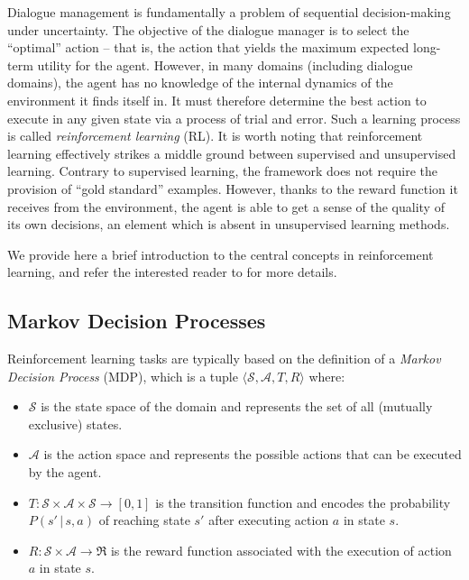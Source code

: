 Dialogue management is fundamentally a problem of sequential decision-making under uncertainty. The objective of the dialogue manager is to select the ``optimal'' action -- that is, the action that yields the maximum expected long-term utility for the agent. However, in many domains (including dialogue domains), the agent has no knowledge of the internal dynamics of the environment it finds itself in.  It must therefore determine the best action to execute in any given state via a process of trial and error.  Such a learning process is called \textit{reinforcement learning} (RL).  It is worth noting that reinforcement learning effectively strikes a middle ground between supervised and unsupervised learning.  Contrary to supervised learning, the framework does not require the provision of ``gold standard'' examples.  However,  thanks to the reward function it receives from the environment, the agent is able to get a sense of the quality of its own decisions, an element which is absent in unsupervised learning methods.  

We provide here a brief introduction to the central concepts in reinforcement learning, and refer the interested reader to \cite{citeulike:112017} for more details. 

\subsection{Markov Decision Processes}
\label{sec:mdp}

Reinforcement learning tasks are typically based on the definition of a \textit{Markov Decision Process} (MDP), which is a tuple $\langle \mathcal{S}, \mathcal{A}, T, R \rangle$ where:
\begin{itemize}
\item $\mathcal{S}$ is the state space of the domain and represents the set of all (mutually exclusive) states.
\item $\mathcal{A}$ is the action space and represents the possible actions that can be executed by the agent.
\item $T: \mathcal{S} \times \mathcal{A} \times \mathcal{S} \rightarrow [0,1]$ is the transition function and encodes the probability $P(s'\, | \, s,a)$ of reaching state $s'$ after executing action $a$ in state $s$.
\item $R:  \mathcal{S} \times \mathcal{A} \rightarrow \Re$ is the reward function associated with the execution of action $a$ in state $s$.
\end{itemize}
 
